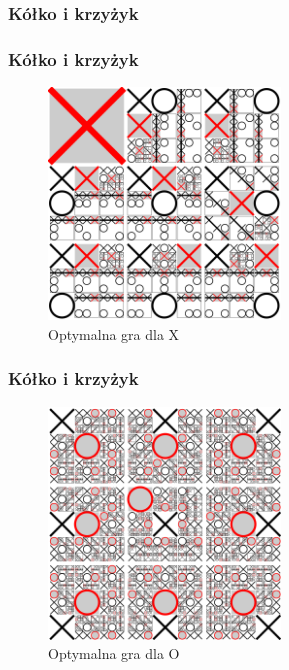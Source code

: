 \documentclass[polish,envcountsect,10pt]{beamer}
\begin{document}
            \subsubsection{Kółko i krzyżyk}
                \begin{frame}
                    \frametitle{Kółko i krzyżyk}
                    \begin{figure}[H]
                        \centering
                        \includegraphics[width=0.55\textwidth,natwidth=480,natheight=480]{images/480px-Tictactoe-X.svg.png}
                        \caption{Optymalna gra dla X}
                    \end{figure}
                \end{frame}
                \begin{frame}
                    \frametitle{Kółko i krzyżyk}
                    \begin{figure}[H]
                        \centering
                        \includegraphics[width=0.55\textwidth,natwidth=480,natheight=480]{images/480px-Tictactoe-O.svg.png}
                        \caption{Optymalna gra dla O}
                    \end{figure}
                \end{frame}
\end{document}
